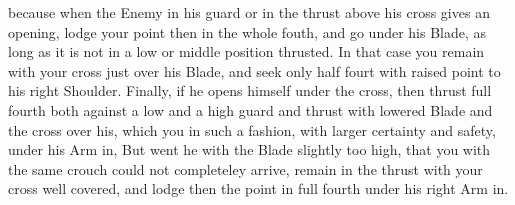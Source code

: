 because when the Enemy in his guard or in the thrust above his cross
gives an opening, lodge your point then in the whole fouth, and go
under his Blade, as long as it is not in a low or middle position thrusted.
In that case you remain with your cross just over his Blade, and seek
only half fourt with raised point to his right Shoulder. Finally, if
he opens himself under the cross, then thrust full fourth both against
a low and a high guard and thrust with lowered Blade and the cross
over his, which you in such a fashion, with larger certainty and
safety, under his Arm in,
But went he with the Blade slightly too high, that you with the same
crouch could not completeley arrive, remain in the thrust with your
cross well covered, and lodge then the point in full fourth under his
right Arm in.


